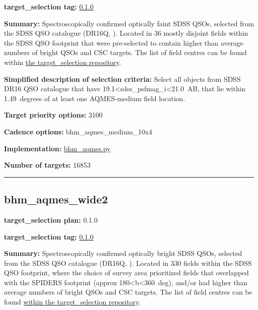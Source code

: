 \noindent\textbf{target\_selection tag:}
\href{https://github.com/sdss/target_selection/tree/0.1.0/}{0.1.0}

\noindent\textbf{Summary:} Spectroscopically confirmed optically faint SDSS QSOs,
selected from the SDSS QSO catalogue (DR16Q,
\citealt{Lyke2020}). Located in 36 mostly disjoint fields within the SDSS QSO
footprint that were pre-selected to contain higher than average numbers
of bright QSOs and CSC targets. The list of field centres can be found
within
\href{https://github.com/sdss/target_selection/blob/0.1.0/python/target_selection/masks/candidate_target_fields_bhm_aqmes_med_v0.2.1.fits}{the
target\_selection repository}.

\noindent\textbf{Simplified description of selection criteria:} Select all
objects from SDSS DR16 QSO catalogue that have
19.1\textless sdss\_psfmag\_i\textless21.0~AB, that lie within
1.49~degrees of at least one AQMES-medium field location.


\noindent\textbf{Target priority options:} 3100

\noindent\textbf{Cadence options:} bhm\_aqmes\_medium\_10x4

\noindent\textbf{Implementation:}
\href{https://github.com/sdss/target_selection/blob/0.1.0/python/target_selection/cartons/bhm_aqmes.py}{bhm\_aqmes.py}

\noindent\textbf{Number of targets:} 16853

\begin{center}\rule{0.5\linewidth}{0.5pt}\end{center}

\hypertarget{bhm_aqmes_wide2_plan0.1.0}{%
\subsection{bhm\_aqmes\_wide2}\label{bhm_aqmes_wide2_plan0.1.0}}

\noindent\textbf{target\_selection plan:} 0.1.0

\noindent\textbf{target\_selection tag:}
\href{https://github.com/sdss/target_selection/tree/0.1.0/}{0.1.0}

\noindent\textbf{Summary:} Spectroscopically confirmed optically bright SDSS
QSOs, selected from the SDSS QSO catalogue (DR16Q,
\citealt{Lyke2020}). Located in 330 fields within the SDSS QSO footprint,
where the choice of survey area prioritized fields that overlapped with
the SPIDERS footprint (approx 180\textless b\textless360~deg), and/or
had higher than average numbers of bright QSOs and CSC targets. The list
of field centres can be found
\href{https://github.com/sdss/target_selection/blob/0.1.0/python/target_selection/masks/candidate_target_fields_bhm_aqmes_wide_v0.2.1.fits}{within
the target\_selection repository}.

